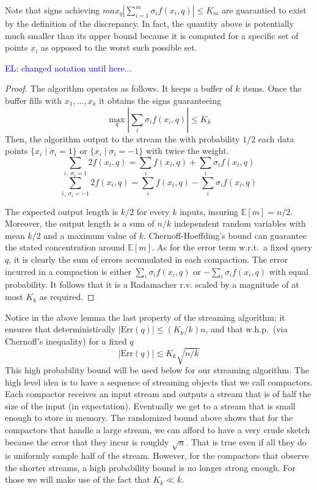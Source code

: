 \documentclass[anon,12pt]{colt2019} %
\newcommand{\el}[1]{\textcolor{blue}{EL: #1}}
\newcommand{\E}{\mathbb{E}}
\begin{document}
Note that signs achieving $max_q \left| \sum_{i=1}^{m} \sigma_i f(x_i, q)\right| \leq K_m$ are guarantied to exist by the definition of the discrepancy. In fact, the quantity above is potentially much smaller than its upper bound because it is computed for a specific set of points $x_i$ as opposed to the worst such possible set. 


\el{changed notation until here...}
\begin{proof}
The algorithm operates as follows. It keeps a buffer of $k$ items. Once the buffer fills with $x_1,\ldots,x_k$ it obtains the signs guaranteeing
$$\max_q \left| \sum_i \sigma_i f(x_i, q)\right| \leq K_k$$
Then, the algorithm output to the stream the with probability $1/2$ each data points $\{x_i \; | \; \sigma_i = 1\}$ or $\{x_i \; | \; \sigma_i = -1\}$ with twice the weight.
$$\sum_{i ,\; \sigma_i=1} 2f(x_i, q) = \sum_{i} f(x_i, q) +  \sum_{i} \sigma_i f(x_i, q)$$
$$\sum_{i ,\; \sigma_i=-1} 2f(x_i, q) = \sum_{i} f(x_i, q) - \sum_{i} \sigma_i f(x_i, q)$$

The expected output length is $k/2$ for every $k$ inputs, insuring $\E[m]=n/2$. Moreover, the output length is a sum of $n/k$ independent random variables with mean $k/2$ and a maximum value of $k$. Chernoff-Hoeffding's bound can guarantee the stated concentration around $\E[m]$.
As for the error term w.r.t.\ a fixed query $q$, it is clearly the sum of errors accumulated in each compaction. The error incurred in a compaction is either 
$\sum_i \sigma_i f(x_i, q)$ or $-\sum_i \sigma_i f(x_i, q)$ with equal probability. It follows that it is a Radamacher r.v. scaled by a magnitude of at most $K_k$ as required.
\end{proof}

Notice in the above lemma the last property of the streaming algorithm; it ensures that deterministically $|\text{Err}(q)| \leq (K_k/k) n$, and that w.h.p.\ (via Chernoff's inequality) for a fixed $q$ 
$$|\text{Err}(q)| \lesssim K_k \sqrt{n/k} $$
This high probability bound will be used below for our streaming algorithm. 
The high level idea is to have a sequence of streaming objects that we call compactors. 
Each compactor receives an input stream and outputs a stream that is of half the size of the input (in expectation). 
Eventually we get to a stream that is small enough to store in memory. 
The randomized bound above shows that for the compactors that handle a large stream, 
we can afford to have a very crude sketch because the error that they incur is roughly $\sqrt{n}$. 
That is true even if all they do is uniformly sample half of the stream. 
However, for the compactors that observe the shorter streams, a high probability bound is no longer strong enough. 
For those we will make use of the fact that $K_k \ll k$.
\end{document}
